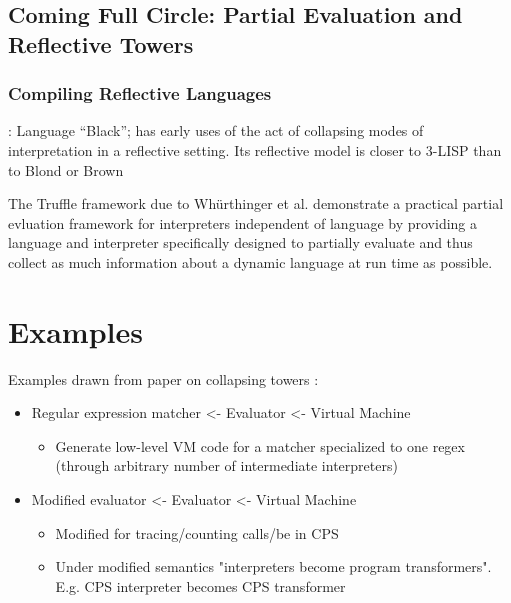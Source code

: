 \documentclass[fleqn]{article}
\theoremstyle{definition}
\begin{document}
\subsection{Coming Full Circle: Partial Evaluation and Reflective Towers}
\subsubsection{Compiling Reflective Languages}
\cite{asai1996duplication}: Language ``Black''; has early uses of the act of collapsing modes of interpretation in a reflective setting. Its reflective model is closer to 3-LISP than to Blond or Brown
\cite{asai2015compiling}

The Truffle framework due to Wh{\"u}rthinger et al. \cite{wurthinger2017practical} demonstrate a practical partial evluation framework for interpreters independent of language by providing a language and interpreter specifically designed to partially evaluate and thus collect as much information about a dynamic language at run time as possible.

\section{Examples}
Examples drawn from paper on collapsing towers \cite{amin2017collapsing}:
\begin{itemize}
	\item Regular expression matcher <- Evaluator <- Virtual Machine
	\begin{itemize}
		\item Generate low-level VM code for a matcher specialized to one regex (through arbitrary number of intermediate interpreters)
	\end{itemize}
	\item Modified evaluator <- Evaluator <- Virtual Machine
	\begin{itemize}
		\item Modified for tracing/counting calls/be in CPS
		\item Under modified semantics "interpreters become program transformers". E.g. CPS interpreter becomes CPS transformer
	\end{itemize}
\end{itemize}
\end{document}

